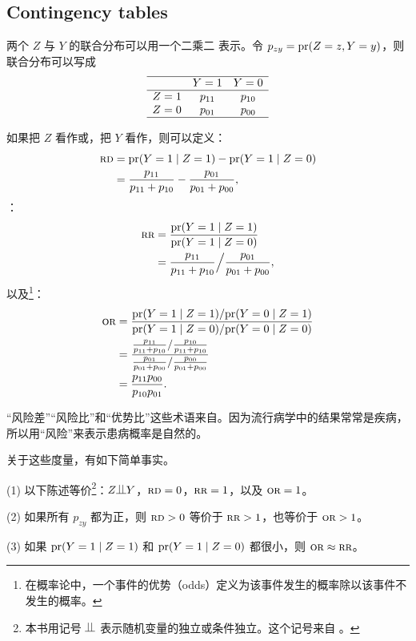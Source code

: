 \subsection{Contingency tables}
\label{sec::twobytwotables-withresume}

两个 $Z$ 与 $Y$ 的联合分布可以用一个二乘二 表示。令 $p_{zy}=\textup{pr}(Z=z,Y=y)$，则联合分布可以写成
\[
\begin{array}{lcc}
\hline
        & Y=1 & Y=0 \\\hline
Z=1 & p_{11} & p_{10}\\
Z=0 & p_{01} & p_{00}\\
\hline
\end{array}
\]

如果把 $Z$ 看作或，把 $Y$ 看作，则可以定义：
\begin{align*}
\textsc{rd}
&= \textup{pr}(Y=1\mid Z=1)-\textup{pr}(Y=1\mid Z=0)\\
&= \frac{p_{11}}{p_{11}+p_{10}}
-\frac{p_{01}}{p_{01}+p_{00}},
\end{align*}
：
\begin{align*}
\textsc{rr}
&= \frac{\textup{pr}(Y=1\mid Z=1)}{\textup{pr}(Y=1\mid Z=0)}\\
&=
\frac{p_{11}}{p_{11}+p_{10}}
\Big/
\frac{p_{01}}{p_{01}+p_{00}},
\end{align*}
以及\footnote{在概率论中，一个事件的优势（odds）定义为该事件发生的概率除以该事件不发生的概率。}：
\begin{align*}
\textsc{or}
&=
\frac{\textup{pr}(Y=1\mid Z=1)/\textup{pr}(Y=0\mid Z=1)}
{\textup{pr}(Y=1\mid Z=0)/\textup{pr}(Y=0\mid Z=0)}\\
&=
\frac{\frac{p_{11}}{p_{11}+p_{10}}/\frac{p_{10}}{p_{11}+p_{10}}}
{\frac{p_{01}}{p_{01}+p_{00}}/\frac{p_{00}}{p_{01}+p_{00}}}\\
&= \frac{p_{11}p_{00}}{p_{10}p_{01}} .
\end{align*}

“风险差”“风险比”和“优势比”这些术语来自。因为流行病学中的结果常常是疾病，所以用“风险”来表示患病概率是自然的。

关于这些度量，有如下简单事实。
\begin{proposition}\label{prop::2x2-independence}
(1) 以下陈述等价\footnote{本书用记号 $\ind$ 表示随机变量的独立或条件独立。这个记号来自 \citet{dawid1979conditional}。}：$Z\ind Y$，$\textsc{rd}=0$，$\textsc{rr}=1$，以及 $\textsc{or}=1$。

(2) 如果所有 $p_{zy}$ 都为正，则 $\textsc{rd}>0$ 等价于 $\textsc{rr}>1$，也等价于 $\textsc{or}>1$。

(3) 如果 $\textup{pr}(Y=1\mid Z=1)$ 和 $\textup{pr}(Y=1\mid Z=0)$ 都很小，则 $\textsc{or}\approx \textsc{rr}$。
\end{proposition}

